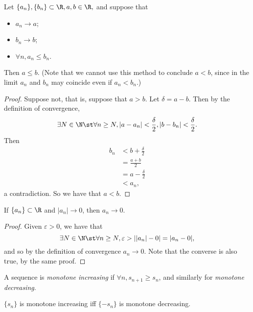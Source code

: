 \documentclass{notes}
\begin{document}
\begin{lemma}
Let $\{a_n\}, \{b_n\} \subset \R, a,b \in \R,$ and suppose that 
\begin{itemize}
  \item $a_n \to a$;
  \item $b_n \to b$;
  \item $\forall n, a_n \leq b_n$.
\end{itemize}
Then $a \leq b$. (Note that we cannot use this method to conclude $a < b$, since in the limit $a_n$ and
$b_n$ may coincide even if $a_n < b_n$.)
\end{lemma}
\begin{proof}
  Suppose not, that is, suppose that $a > b$. Let $\delta = a-b$. Then by the definition of convergence,
  $$\exists N\in\N \st \forall n \geq N, |a-a_n| < \frac{\delta}{2}, |b - b_n| < \frac{\delta}{2}.$$
  Then 
  \begin{align*}
    b_n &< b + \frac{\delta}{2} \\
        &= \frac{a + b}{2} \\
        &= a - \frac{\delta}{2} \\
        &< a_n,
  \end{align*}
  a contradiction. So we have that $a < b$.
\end{proof}

\begin{lemma}
  If $\{a_n\} \subset \R$ and $|a_n| \to 0$, then $a_n \to 0$.
\end{lemma}
\begin{proof}
  Given $\varepsilon > 0$, we have that $$\exists N\in\N \st \forall n \geq N, \varepsilon > ||a_n| - 
  0| = |a_n - 0|,$$ and so by the definition of convergence $a_n \to 0$. Note that the converse is also
  true, by the same proof.
\end{proof}

\begin{defn}
  A sequence is \emph{monotone increasing} if\/ $\forall n, s_{n+1} \geq s_n$, and similarly for 
  \emph{monotone decreasing}.
\end{defn}
\begin{lemma}
  $\{s_n\}$ is monotone increasing iff $\{-s_n\}$ is monotone decreasing.
\end{lemma}
\end{document}
